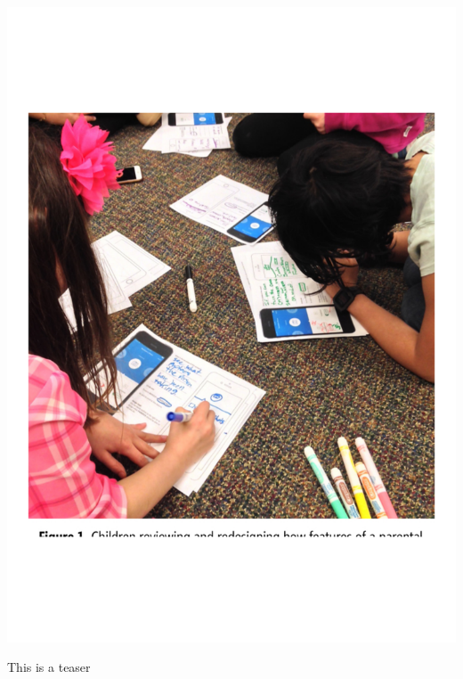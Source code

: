 \documentclass[sigchi, review]{acmart}
\begin{document}
\begin{teaserfigure}
  \includegraphics[width=\textwidth]{Children}
  \caption{This is a teaser}
  \label{fig:teaser}
\end{teaserfigure}


\maketitle



\cite{mcnally2018co}
\cite{chaves2018single}
\cite{robinson2018make}
 



\end{document}
